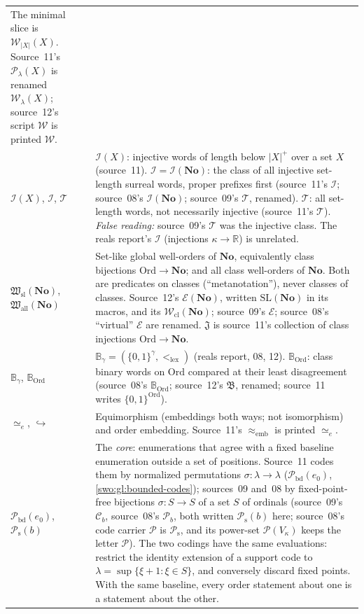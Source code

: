 \documentclass[11pt]{article}
\theoremstyle{definition}
\theoremstyle{remark}
\newcommand{\No}{\mathbf{No}}
\newcommand{\Ord}{\mathrm{Ord}}
\newcommand{\WO}{\mathcal W}
\newcommand{\Words}{\mathcal I}
\newcommand{\I}{\mathcal I}
\newcommand{\WordsAll}{\mathcal T}
\newcommand{\Hsl}{\mathfrak W_{\mathrm{sl}}}
\newcommand{\Hall}{\mathfrak W_{\mathrm{all}}}
\newcommand{\Jinj}{\mathfrak J}
\newcommand{\Pbd}{\mathcal P_{\mathrm{bd}}}
\newcommand{\Psupp}{\mathcal P_{\mathrm{s}}}
\newcommand{\B}{\mathbb B}
\newcommand{\BOrd}{\mathbb B_{\Ord}}
\newcommand{\two}{\{0,1\}}
\newcommand{\lex}{\mathrm{lex}}
\newcommand{\emb}{\hookrightarrow}
\newcommand{\equi}{\mathrel{\simeq_{\!e}}}
\newcommand{\card}[1]{\lvert #1\rvert}
\begin{document}
\begin{longtable}{@{}>{\raggedright\arraybackslash}p{}>{\raggedright\arraybackslash}p{}@{}}
The minimal slice is $\WO_{\card X}(X)$. Source~11's $\mathcal P_\lambda(X)$
is renamed $\WO_\lambda(X)$; source~12's script $\mathscr W$ is printed
$\WO$.\\[3pt]
$\Words(X)$, $\Words$, $\WordsAll$ &
$\Words(X)$: injective words of length below $\card X^+$ over a set $X$
(source~11). $\Words=\Words(\No)$: the class of all injective set-length
surreal words, proper prefixes first (source~11's $\mathcal I$; source~08's
$\I(\No)$; source~09's $\mathcal T$, renamed). $\WordsAll$: all set-length
words, not necessarily injective (source~11's $\mathcal T$). \emph{False
reading:} source~09's $\mathcal T$ was the injective class. The reals
report's $\mathcal I$ (injections $\kappa\to\mathbb R$) is unrelated.\\[3pt]
$\Hsl(\No)$, $\Hall(\No)$ &
Set-like global well-orders of $\No$, equivalently class bijections
$\Ord\to\No$; and all class well-orders of $\No$. Both are predicates on
classes (``metanotation''), never classes of classes. Source~12's
$\mathscr E(\No)$, written $\mathrm{SL}(\No)$ in its macros, and its
$\WO_{\mathrm{cl}}(\No)$; source~09's $\mathscr E$; source~08's ``virtual''
$\mathscr E$ are renamed. $\Jinj$ is source~11's collection of class
injections $\Ord\to\No$.\\[3pt]
$\B_\gamma$, $\BOrd$ &
$\B_\gamma=(\two^\gamma,<_\lex)$ (reals report, 08, 12). $\BOrd$: class binary
words on $\Ord$ compared at their least disagreement (source~08's
$\B_{\Ord}$; source~12's $\mathfrak B$, renamed; source~11 writes
$\two^{\Ord}$).\\[3pt]
$\equi$, $\emb$ &
Equimorphism (embeddings both ways; not isomorphism) and order embedding.
Source~11's $\approx_{\mathrm{emb}}$ is printed $\equi$.\\[3pt]
$\Pbd(e_0)$, $\Psupp(b)$ &
The \emph{core}: enumerations that agree with a fixed baseline enumeration
outside a set of positions. Source~11 codes them by normalized permutations
$\sigma:\lambda\to\lambda$ ($\Pbd(e_0)$, \cref{swo:gl:bounded-codes});
sources~09 and~08 by fixed-point-free bijections $\sigma:S\to S$ of a set $S$
of ordinals (source~09's $\mathcal C_b$, source~08's $\mathcal P_b$, both
written $\Psupp(b)$ here; source~08's code carrier $\mathcal P$ is
$\Psupp$, and its power-set $\mathcal P(V_\kappa)$ keeps the letter
$\mathcal P$). The two codings have the same evaluations: restrict the
identity extension of a support code to $\lambda=\sup\{\xi+1:\xi\in S\}$,
and conversely discard fixed points. With the same baseline, every order
statement about one is a statement about the other.\\[3pt]

\end{longtable}
\end{document}
